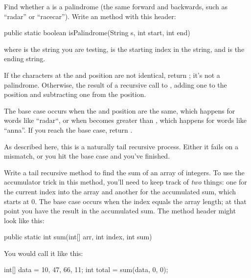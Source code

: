 \begin{exercise}
Find whether a  is a palindrome (the same forward and backwards, such as ``radar'' or ``racecar''). Write an  method with this header:

\begin{code}
public static boolean isPalindrome(String s, int start, int end) 
\end{code}

where  is the string you are testing,  is the starting index in the string, and  is the ending string.

If the characters at the  and  position are not identical, return ; it's not a palindrome. Otherwise,  the result of a recursive call to , adding one to the  position and subtracting one from the  position.

The base case occurs when the  and  position are the same, which happens for words like ``radar``, or when  becomes greater than , which happens for words like ``anna''. If you reach the base case, return .

As described here, this is a naturally tail recursive process. Either it fails on a mismatch, or you hit the base case and you've finished.

\end{exercise}


\begin{exercise}
Write a tail recursive method to find the sum of an array of integers. To use the accumulator trick in this method, you'll need to keep track of {\em two} things: one for the current index into the array and another for the accumulated sum, which starts at 0. The base case occurs when the index equals the array length; at that point you have the result in the accumulated sum. The method header might look like this:

\begin{code}
public static int sum(int[] arr, int index, int sum)
\end{code}

You would call it like this:

\begin{code}
int[] data = {10, 47, 66, 11};
int total = sum(data, 0, 0);
\end{code}

\end{exercise}

